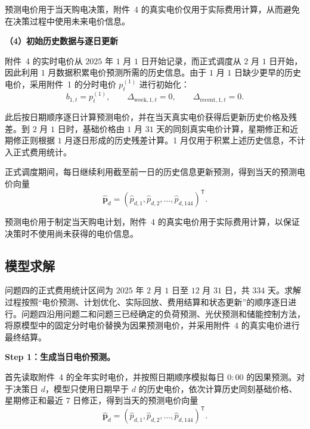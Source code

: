 预测电价用于当天购电决策，附件~4 的真实电价仅用于实际费用计算，从而避免在决策过程中使用未来电价信息。

\textbf{（4）初始历史数据与逐日更新}

附件~4 的实时电价从 $2025$ 年 $1$ 月 $1$ 日开始记录，而正式调度从 $2$ 月 $1$ 日开始，因此利用 $1$ 月数据积累电价预测所需的历史信息。由于 $1$ 月 $1$ 日缺少更早的历史电价，采用附件~1 的分时电价 $p_t^{(1)}$ 进行初始化：
\begin{equation}
b_{1,t}=p_t^{(1)},\qquad
\Delta_{\mathrm{week},1,t}=0,\qquad
\Delta_{\mathrm{recent},1,t}=0.
\label{eq:q4_price_cold_start}
\end{equation}

此后按日期顺序逐日计算预测电价，并在当天真实电价获得后更新历史价格及残差。到 $2$ 月 $1$ 日时，基础价格由 $1$ 月 $31$ 天的同刻真实电价计算，星期修正和近期修正则根据 $1$ 月逐日形成的历史残差计算。1 月仅用于积累上述历史信息，不计入正式费用统计。

正式调度期间，每日继续利用截至前一日的历史信息更新预测，得到当天的预测电价向量
\begin{equation}
\hat{\boldsymbol p}_d
=
\left(
\hat p_{d,1},
\hat p_{d,2},
\ldots,
\hat p_{d,144}
\right)^{\mathsf T}.
\label{eq:q4_price_vector}
\end{equation}

预测电价用于制定当天购电计划，附件~4 的真实电价用于实际费用计算，以保证决策时不使用尚未获得的电价信息。


\subsection{模型求解}

问题四的正式费用统计区间为 $2025$ 年 $2$ 月 $1$ 日至 $12$ 月 $31$ 日，共 $334$ 天。求解过程按照“电价预测、计划优化、实际回放、费用结算和状态更新”的顺序逐日进行。问题四沿用问题二和问题三已经确定的负荷预测、光伏预测和储能控制方法，将原模型中的固定分时电价替换为因果预测电价，并采用附件~4 的真实电价进行最终结算。

\textbf{Step 1：生成当日电价预测。}

首先读取附件~4 的全年实时电价，并按照日期顺序模拟每日 $0{:}00$ 的因果预测。对于决策日 $d$，模型只使用日期早于 $d$ 的历史电价，依次计算历史同刻基础价格、星期修正和最近 $7$ 日修正，得到当天的预测电价向量
\begin{equation}
\hat{\boldsymbol p}_{d}
=
\left(
\hat p_{d,1},
\hat p_{d,2},
\ldots,
\hat p_{d,144}
\right)^{\mathsf T}.
\end{equation}

